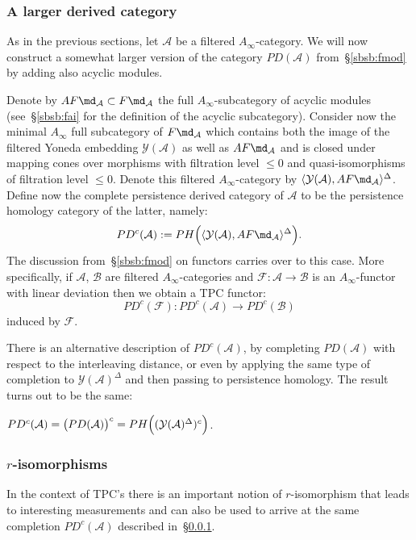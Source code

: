 \subsubsection{A larger derived category} \label{sbsb:fmod-2} As in
the previous sections, let $\mathcal{A}$ be a filtered
$A_{\infty}$-category. We will now construct a somewhat larger version
of the category $PD(\mathcal{A})$ from~\S\ref{sbsb:fmod} by adding
also acyclic modules.

Denote by $AF\md_{\mathcal{A}} \subset F\md_{\mathcal{A}}$ the full
$A_{\infty}$-subcategory of acyclic modules (see~\S\ref{sbsb:fai} for
the definition of the acyclic subcategory). Consider now the minimal
$A_{\infty}$ full subcategory of $F \md_{\mathcal{A}}$ which contains
both the image of the filtered Yoneda embedding
$\mathcal{Y}(\mathcal{A})$ as well as $AF\md_{\mathcal{A}}$ and is
closed under mapping cones over morphisms with filtration level
$\leq 0$ and quasi-isomorphisms of filtration level $\leq 0$.  Denote
this filtered $A_{\infty}$-category by
$\langle \mathcal{Y}(\mathcal{A}), AF\md_{\mathcal{A}}
\rangle^{\Delta}$. Define now the complete persistence derived
category of $\mathcal{A}$ to be the persistence homology category of
the latter, namely:
$$PD^{c}(\mathcal{A}) := PH \Bigl( \langle \mathcal{Y}(\mathcal{A}),
AF\md_{\mathcal{A}}\rangle^{\Delta} \Bigr).$$ The discussion
from~\S\ref{sbsb:fmod} on functors carries over to this case. More
specifically, if $\mathcal{A}$, $\mathcal{B}$ are filtered
$A_{\infty}$-categories and
$\mathcal{F}: \mathcal{A} \longrightarrow \mathcal{B}$ is an
$A_{\infty}$-functor with linear deviation then we obtain a TPC
functor:
$$PD^c(\mathcal{F}): PD^c(\mathcal{A})
\longrightarrow PD^c(\mathcal{B})$$ induced by $\mathcal{F}$.


There is an alternative description of $PD^c(\mathcal{A})$, by
completing $PD(\mathcal{A})$ with respect to the interleaving distance, or even by applying  the same
type of completion to $\mathcal{Y}(\mathcal{A})^{\Delta}$ and then
passing to persistence homology. The result turns out to be the same:
\begin{lem} \label{l:PDc}
  $PD^{c}(\mathcal{A}) = \bigl(PD(\mathcal{A})\bigr)^{c} = PH \Bigl(
  (\mathcal{Y}(\mathcal{A})^{\Delta})^{c} \Bigr)$.
\end{lem}

\subsubsection{$r$-isomorphisms} \label{sbsb:r-iso} In the context of
TPC's there is an important notion of $r$-isomorphism that leads to
interesting measurements and can also be used to arrive at the same
completion $PD^c(\mathcal{A})$ described in~\S\ref{sbsb:fmod-2}.

